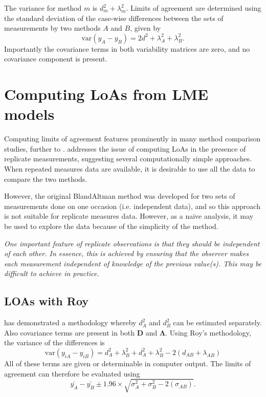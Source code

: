\documentclass[12pt, a4paper]{report}
\theoremstyle{plain}
\theoremstyle{definition}
\theoremstyle{remark}
\begin{document}
	The variance for method $m$ is $d^2_{m}+\lambda^2_{m}$. Limits of agreement are determined using the standard deviation of the case-wise differences between the sets of measurements by two methods $A$ and $B$, given by
	\begin{equation}
	\mbox{var} (y_{A}-y_{B}) = 2d^2 + \lambda^2_{A}+ \lambda^2_{B}.
	\end{equation}
	Importantly the covariance terms in both variability matrices are zero, and no covariance component is present.
	
		

\section{Computing LoAs from LME models}

Computing limits of agreement features prominently in many method comparison studies, further to \citet{BA86,BA99}.
\citet{BA99} addresses the issue of computing LoAs in the presence of replicate measurements, suggesting several computationally simple approaches. When repeated measures data are available, it is desirable to use
all the data to compare the two methods.

However, the original BlandAltman method was developed for two sets of measurements done on one occasion (i.e. independent data), and so this approach is not suitable for replicate measures data. However, as a naive analysis, it may be used to explore the data because of the simplicity of the method.
	
	\emph{
		One important feature of replicate observations is that they should be independent
		of each other. In essence, this is achieved by ensuring that the observer makes each
		measurement independent of knowledge of the previous value(s). This may be difficult
		to achieve in practice.}
	
	

		\subsection{LOAs with Roy}
		
		\citet{ARoy2009} has demonstrated a methodology whereby $d^2_{A}$ and $d^2_{B}$ can be estimated separately. Also covariance terms are present in both $\boldsymbol{D}$ and $\boldsymbol{\Lambda}$. Using Roy's methodology, the variance of the differences is
		\begin{equation}
		\mbox{var} (y_{iA}-y_{iB})= d^2_{A} + \lambda^2_{B} + d^2_{A} + \lambda^2_{B} - 2(d_{AB} + \lambda_{AB})
		\end{equation}
		All of these terms are given or determinable in computer output.
		The limits of agreement can therefore be evaluated using
		\begin{equation}
		\bar{y_{A}}-\bar{y_{B}} \pm 1.96 \times \sqrt{ \sigma^2_{A} + \sigma^2_{B}  - 2(\sigma_{AB})}.
		\end{equation}
\end{document}
